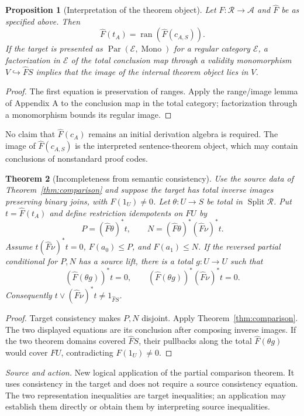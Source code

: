 \documentclass[11pt]{article}
\newtheorem{theorem}{Theorem}[section]
\newtheorem{proposition}[theorem]{Proposition}
\theoremstyle{definition}\newtheorem{definition}[theorem]{Definition}
\newcommand{\Split}{\operatorname{Split}}
\newcommand{\Par}{\operatorname{Par}}
\newcommand{\ran}{\operatorname{ran}}
\newcommand{\R}{\mathscr R}
\newcommand{\A}{\mathcal A}
\newcommand{\E}{\mathcal E}
\newcommand{\source}[1]{\par\smallskip\noindent\textit{Source and action.} #1\par\smallskip}
\begin{document}
\begin{proposition}[Interpretation of the theorem object]\label{prop:image}
Let $F:\R\to\A$ and $\widehat F$ be as specified above. Then
\[
 \widehat F(t_A)=\ran(\widehat F(c_{A,S})).
\]
If the target is presented as $\Par(\E,\operatorname{Mono})$ for
a regular category $\E$, a factorization in $\E$ of the total
conclusion map through a validity monomorphism $V\hookrightarrow
\widehat F S$ implies that the image of the internal theorem object
lies in $V$.
\end{proposition}
\begin{proof}
The first equation is preservation of ranges. Apply the range/image
lemma of Appendix A to the conclusion map in the total category;
factorization through a monomorphism bounds its regular image.
\end{proof}
No claim that $\widehat F(c_A)$ remains an initial derivation algebra
is required. The image of $\widehat F(c_{A,S})$ is the interpreted
sentence-theorem object, which may contain conclusions of nonstandard
proof codes.

\begin{theorem}[Incompleteness from semantic consistency]\label{thm:logical}
Use the source data of Theorem~\ref{thm:comparison} and suppose the
target has total inverse images preserving binary joins, with
$F(1_U)\ne0$. Let $\theta:U\to S$ be total in $\Split\R$.
Put $t=\widehat F(t_A)$ and define restriction idempotents on $FU$ by
\[
 P=(\widehat F\theta)^*t,\qquad
 N=(\widehat F\theta)^*(\widehat F\nu)^*t.
\]
Assume $t(\widehat F\nu)^*t=0$, $F(a_0)\le P$, and
$F(a_1)\le N$. If the reversed partial conditional for $P,N$
has a source lift, there is a total $g:U\to U$ such that
\[
 (\widehat F(\theta g))^*t=0,\qquad
 (\widehat F(\theta g))^*(\widehat F\nu)^*t=0.
\]
Consequently $t\vee(\widehat F\nu)^*t\ne1_{\widehat F S}$.
\end{theorem}
\begin{proof}
Target consistency makes $P,N$ disjoint. Apply
Theorem~\ref{thm:comparison}. The two displayed equations are
its conclusion after composing inverse images. If the two theorem
domains covered $\widehat F S$, their pullbacks along the total
$\widehat F(\theta g)$ would cover $FU$, contradicting
$F(1_U)\ne0$.
\end{proof}
\source{New logical application of the partial comparison theorem. It uses consistency in the target and does not require a source consistency equation. The two representation inequalities are target inequalities; an application may establish them directly or obtain them by interpreting source inequalities.}
\end{document}
